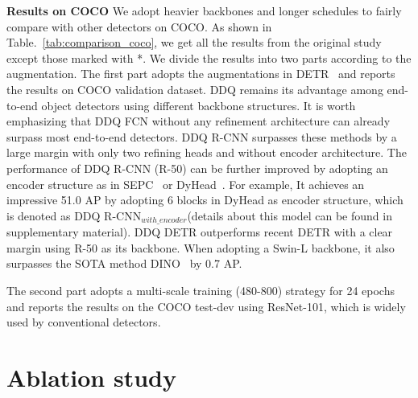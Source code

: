 \documentclass[10pt,twocolumn,letterpaper]{article}
\begin{document}
\noindent \textbf{Results on COCO} We adopt heavier backbones and longer schedules to fairly compare with other detectors on COCO. As shown in Table.~\ref{tab:comparison_coco}, we get all the results from the original study except those marked with *. We divide the results into two parts according to the augmentation. The first part adopts the augmentations in DETR~\cite{carion2020end} and reports the results on COCO validation dataset. DDQ remains its advantage among end-to-end object detectors using different backbone structures. It is worth emphasizing that DDQ FCN without any refinement architecture can already surpass most end-to-end detectors. DDQ R-CNN surpasses these methods by a large margin with only two refining heads and without encoder architecture. The performance of DDQ R-CNN (R-50) can be further improved by adopting an encoder structure as in SEPC~\cite{Wang_2020_CVPR} or DyHead~\cite{dai2021dynamichead}. For example, It achieves an impressive 51.0 AP by adopting 6 blocks in DyHead as encoder structure, which is denoted as DDQ R-CNN$_{with\_encoder}$(details about this model can be found in supplementary material). DDQ DETR outperforms recent DETR with a clear margin using R-50 as its backbone. When adopting a Swin-L backbone, it also surpasses the SOTA method DINO~\cite{zhang2022dino} by 0.7 AP.

The second part adopts a multi-scale training (480-800) strategy for 24 epochs and reports the results on the COCO test-dev using ResNet-101, which is widely used by conventional detectors.

\section{Ablation study}
\end{document}
